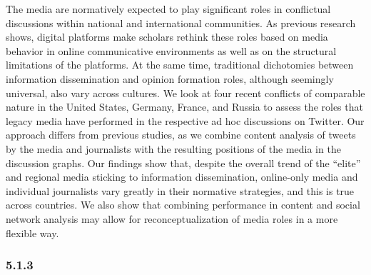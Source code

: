 The media are normatively expected to play significant roles in conflictual discussions within national and international communities. As previous research shows, digital platforms make scholars rethink these roles based on media behavior in online communicative environments as well as on the structural limitations of the platforms. At the same time, traditional dichotomies between information dissemination and opinion formation roles, although seemingly universal, also vary across cultures. We look at four recent conflicts of comparable nature in the United States, Germany, France, and Russia to assess the roles that legacy media have performed in the respective ad hoc discussions on Twitter. Our approach differs from previous studies, as we combine content analysis of tweets by the media and journalists with the resulting positions of the media in the discussion graphs. Our findings show that, despite the overall trend of the “elite” and regional media sticking to information dissemination, online-only media and individual journalists vary greatly in their normative strategies, and this is true across countries. We also show that combining performance in content and social network analysis may allow for reconceptualization of media roles in a more flexible way.

\subsubsection{5.1.3}

